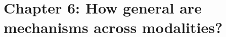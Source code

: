 \documentclass[11pt]{article}
\begin{document}


\section*{Chapter 6: How general are mechanisms across modalities?}
\end{document}
